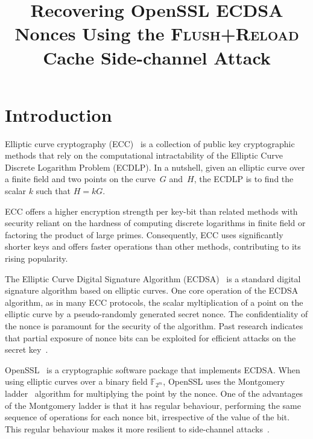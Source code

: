 \documentclass{llncs}
\begin{document}
\title{Recovering OpenSSL ECDSA Nonces Using the \textsc{Flush+Reload} Cache Side-channel Attack}

\maketitle

\begin{abstract}
\end{abstract}

\section{Introduction}
Elliptic curve cryptography (ECC)~\cite{miller85use,koblitz87elliptic} is a collection of public key cryptographic methods that rely on the computational
intractability of the Elliptic Curve Discrete Logarithm Problem (ECDLP).
In a nutshell, given an elliptic curve over a finite field and two points on the curve~$G$ and~$H$,
the ECDLP is to find the scalar $k$ such that $H=kG$.

ECC offers a higher encryption strength per key-bit than related methods with security reliant on the hardness of computing discrete logarithms in finite field or factoring the product of large primes.
Consequently, ECC uses significantly shorter keys and offers faster operations than other methods, contributing to its rising popularity.

The Elliptic Curve Digital Signature Algorithm (ECDSA)~\cite{johnson01elliptic,fips186,ansi962} is a standard
digital signature algorithm based on elliptic curves. One core operation of the ECDSA algorithm, as in many ECC protocols, the scalar myltiplication of a point on the elliptic curve by a pseudo-randomly generated secret nonce. The confidentiality of the nonce is paramount for the security of the algorithm. Past research indicates that partial exposure of nonce bits can be exploited for efficient attacks on the secret key~\cite{nguyen03insecurity,brumley11remote}.

OpenSSL~\cite{openssl} is a cryptographic software package that implements ECDSA.
When using elliptic curves over a binary field $\mathbb{F}_{2^m}$, OpenSSL uses the 
Montgomery ladder~\cite{montgomery87speeding,joye03montgomery} algorithm for multiplying the point by the nonce.
One of the advantages of the Montgomery ladder is that it has regular behaviour, performing
the same sequence of operations for each nonce bit, irrespective of the value of the bit.
This regular behaviour makes it more resilient to side-channel attacks~\cite{joye03montgomery,okeya00elliptic}.
\end{document}
